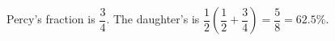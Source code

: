 Percy's fraction is $\dfrac{3}{4}$. The daughter's is $\dfrac{1}{2}(\dfrac{1}{2}+\dfrac{3}{4})=\dfrac{5}{8}=\boxed{62.5\%}$.
